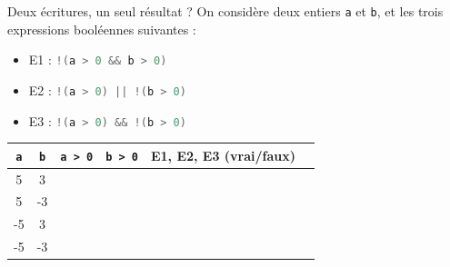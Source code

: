 \begin{UPSTIexercice}{Deux écritures, un seul résultat ?}
    On considère deux entiers \texttt{a} et \texttt{b}, et les trois expressions booléennes suivantes :
    \begin{itemize}
        \item E1 : \lstinline[language=C]{!(a > 0 && b > 0)}
        \item E2 : \lstinline[language=C]{!(a > 0) || !(b > 0)}
        \item E3 : \lstinline[language=C]{!(a > 0) && !(b > 0)}
    \end{itemize}

    \begin{center}
        \begin{tabular}{|c|c|c|c|c|c|}
            \hline
            \texttt{a} & \texttt{b} & \texttt{a > 0} & \texttt{b > 0} & E1, E2, E3 (vrai/faux) \\
            \hline
            5          & 3          &                &                &                        \\[0.5cm]
            \hline
            5          & -3         &                &                &                        \\[0.5cm]
            \hline
            -5         & 3          &                &                &                        \\[0.5cm]
            \hline
            -5         & -3         &                &                &                        \\[0.5cm]
            \hline
        \end{tabular}
    \end{center}
\end{UPSTIexercice}

